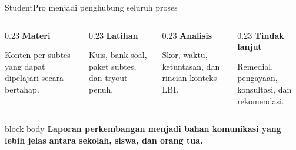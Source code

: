 \begin{frame}{StudentPro menjadi penghubung seluruh proses}
  \begin{columns}[T,onlytextwidth]
    \begin{column}{0.23\textwidth}
      \textbf{Materi}\par
      \vspace{0.10cm}
      {\fontsize{12}{15}\selectfont Konten per subtes yang dapat dipelajari secara bertahap.}
    \end{column}
    \begin{column}{0.23\textwidth}
      \textbf{Latihan}\par
      \vspace{0.10cm}
      {\fontsize{12}{15}\selectfont Kuis, bank soal, paket subtes, dan tryout penuh.}
    \end{column}
    \begin{column}{0.23\textwidth}
      \textbf{Analisis}\par
      \vspace{0.10cm}
      {\fontsize{12}{15}\selectfont Skor, waktu, ketuntasan, dan rincian konteks LBI.}
    \end{column}
    \begin{column}{0.23\textwidth}
      \textbf{Tindak lanjut}\par
      \vspace{0.10cm}
      {\fontsize{12}{15}\selectfont Remedial, pengayaan, konsultasi, dan rekomendasi.}
    \end{column}
  \end{columns}
  \vspace{0.42cm}
  \begin{beamercolorbox}[rounded=true,sep=0.25cm,wd=\textwidth]{block body}
    \centering\bfseries Laporan perkembangan menjadi bahan komunikasi yang lebih jelas antara sekolah, siswa, dan orang tua.
  \end{beamercolorbox}
\end{frame}


